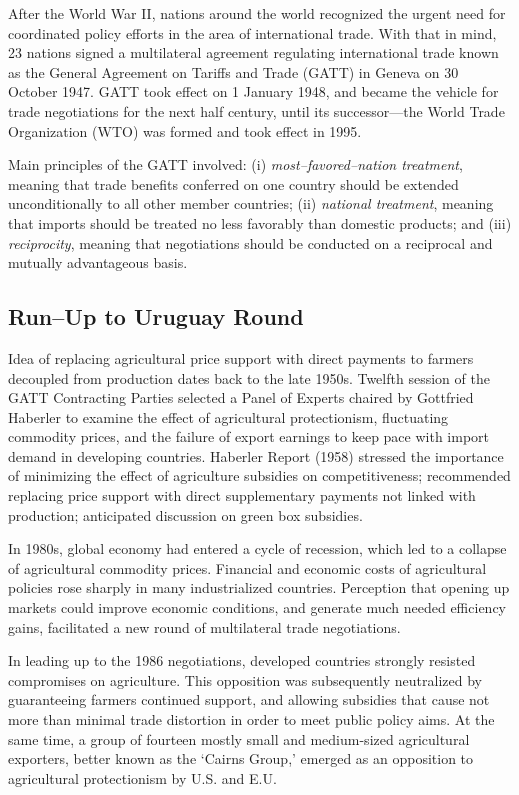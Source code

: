 \documentclass[]{book}
\begin{document}
After the World War II, nations around the world recognized the urgent
need for coordinated policy efforts in the area of international trade.
With that in mind, 23 nations signed a multilateral agreement regulating
international trade known as the General Agreement on Tariffs and Trade
(GATT) in Geneva on 30 October 1947. GATT took effect on 1 January 1948,
and became the vehicle for trade negotiations for the next half century,
until its successor---the World Trade Organization (WTO) was formed and
took effect in 1995.

Main principles of the GATT involved: (i) \emph{most--favored--nation
treatment}, meaning that trade benefits conferred on one country should
be extended unconditionally to all other member countries; (ii)
\emph{national treatment}, meaning that imports should be treated no
less favorably than domestic products; and (iii) \emph{reciprocity},
meaning that negotiations should be conducted on a reciprocal and
mutually advantageous basis.

\subsection{Run--Up to Uruguay Round}\label{runup-to-uruguay-round}

Idea of replacing agricultural price support with direct payments to
farmers decoupled from production dates back to the late 1950s. Twelfth
session of the GATT Contracting Parties selected a Panel of Experts
chaired by Gottfried Haberler to examine the effect of agricultural
protectionism, fluctuating commodity prices, and the failure of export
earnings to keep pace with import demand in developing countries.
Haberler Report (1958) stressed the importance of minimizing the effect
of agriculture subsidies on competitiveness; recommended replacing price
support with direct supplementary payments not linked with production;
anticipated discussion on green box subsidies.

In 1980s, global economy had entered a cycle of recession, which led to
a collapse of agricultural commodity prices. Financial and economic
costs of agricultural policies rose sharply in many industrialized
countries. Perception that opening up markets could improve economic
conditions, and generate much needed efficiency gains, facilitated a new
round of multilateral trade negotiations.

In leading up to the 1986 negotiations, developed countries strongly
resisted compromises on agriculture. This opposition was subsequently
neutralized by guaranteeing farmers continued support, and allowing
subsidies that cause not more than minimal trade distortion in order to
meet public policy aims. At the same time, a group of fourteen mostly
small and medium-sized agricultural exporters, better known as the
`Cairns Group,' emerged as an opposition to agricultural protectionism
by U.S. and E.U.
\end{document}
